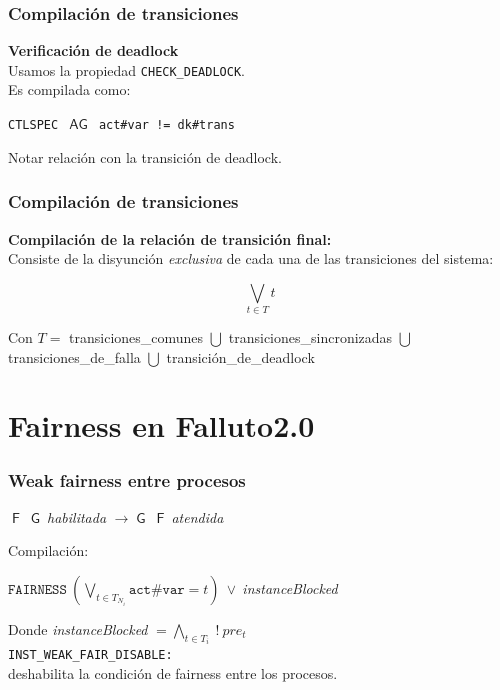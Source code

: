 \documentclass[serif]{beamer}
\newcommand{\G}{\mathop{\mathsf{G}}}
\newcommand{\F}{\mathop{\mathsf{F}}}
\newcommand{\AG}{\mathop{\mathsf{AG}}}
\begin{document}
\begin{frame}
\frametitle{Compilación de transiciones}
\textbf{\Large Verificación de deadlock}\\[0.3cm]
Usamos la propiedad \texttt{CHECK\_DEADLOCK}.\\[0.3cm]
Es compilada como:
\begin{framed}
\texttt{CTLSPEC~$\AG$~act\#var~!=~dk\#trans}
\end{framed}
Notar relación con la transición de deadlock.
\end{frame}



\begin{frame}
\frametitle{Compilación de transiciones}
\textbf{\Large Compilación de la relación de transición final:}\\[0.3cm]
Consiste de la disyunción \textit{exclusiva} de cada una de las 
transiciones del sistema:
\begin{framed}
$$\bigvee_{t \in T} t $$
\end{framed}
Con $T =$ transiciones\_comunes $\bigcup$ transiciones\_sincronizadas 
$\bigcup$ transiciones\_de\_falla $\bigcup$ transición\_de\_deadlock
\end{frame}

\section[Fairness]{Fairness en Falluto2.0}

\begin{frame}
\frametitle{Weak fairness entre procesos}
\begin{framed}
$\F~\G~$\textit{habilitada} $\rightarrow \G~\F~$\textit{atendida}
\end{framed}
Compilación:
\begin{framed}
$\texttt{FAIRNESS}~(\bigvee_{t \in T_{N_i}} \texttt{act\#var} = t)~\vee~$\textit{instanceBlocked}
\end{framed}
Donde \textit{instanceBlocked} $= \bigwedge_{t \in T_i}~!~pre_t~$\\[0.5cm]
\texttt{INST\_WEAK\_FAIR\_DISABLE:}\\
deshabilita la condición de fairness entre los procesos.
\end{frame}
\end{document}
